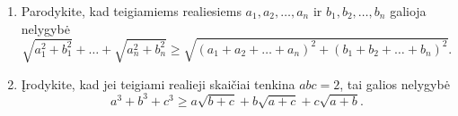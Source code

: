 \begin{enumerate}
  \item Parodykite, kad teigiamiems realiesiems $a_1,a_2,\ldots,a_n$ ir
    $b_1,b_2,\ldots,b_n$ galioja nelygybė
    $$\sqrt{a_1^2+b_1^2}+\ldots+\sqrt{a_n^2+b_n^2}\geq\sqrt{(a_1+a_2+\ldots+a_n)^2+(b_1+b_2+\ldots+b_n)^2}.$$
  \item {} Įrodykite, kad jei teigiami realieji
    skaičiai tenkina $abc=2$, tai galios nelygybė $$a^3+b^3+c^3\geq
    a\sqrt{b+c}+b\sqrt{a+c}+c\sqrt{a+b}.$$

\end{enumerate}
